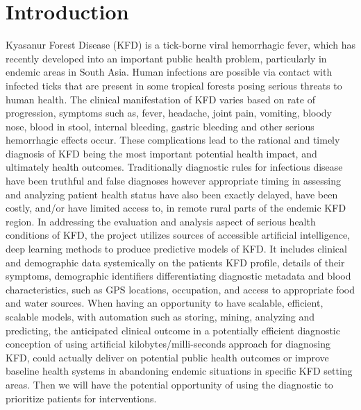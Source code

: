 \documentclass[conference]{IEEEtran}
\begin{document}
\section{Introduction}
Kyasanur Forest Disease (KFD) is a tick-borne viral hemorrhagic fever, which has recently developed into an important public health problem, particularly in endemic areas in South Asia. Human infections are possible via contact with infected ticks that are present in some tropical forests posing serious threats to human health. The clinical manifestation of KFD varies based on rate of progression, symptoms such as, fever, headache, joint pain, vomiting, bloody nose, blood in stool, internal bleeding, gastric bleeding and other serious hemorrhagic effects occur. These complications lead to the rational and timely diagnosis of KFD being the most important potential health impact, and ultimately health outcomes. Traditionally diagnostic rules for infectious disease have been truthful and false diagnoses however appropriate timing in assessing and analyzing patient health status have also been exactly delayed, have been costly, and/or have limited access to, in remote rural parts of the endemic KFD region. In addressing the evaluation and analysis aspect of serious health conditions of KFD, the project utilizes sources of accessible artificial intelligence, deep learning methods to produce predictive models of KFD. It includes clinical and demographic data systemically on the patients KFD profile, details of their symptoms, demographic identifiers differentiating diagnostic metadata and blood characteristics, such as GPS locations, occupation, and access to appropriate food and water sources. When having an opportunity to have scalable, efficient, scalable models, with automation such as storing, mining, analyzing and predicting, the anticipated clinical outcome in a potentially efficient diagnostic conception of using artificial kilobytes/milli-seconds approach for diagnosing KFD, could actually deliver on potential public health outcomes or improve baseline health systems in abandoning endemic situations in specific KFD setting areas. Then we will have the potential opportunity of using the diagnostic to prioritize patients for interventions.
\par\vspace{1em}
\end{document}

